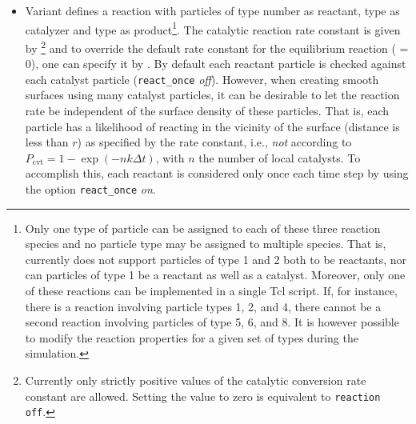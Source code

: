 \begin{itemize}
\item Variant  defines a reaction with particles of type
  number  as reactant, type  as catalyzer and type
   as product\footnote{Only one type of particle can be
    assigned to each of these three reaction species and no particle
    type may be assigned to multiple species. That is, \es currently
    does not support particles of type 1 and 2 both to be reactants,
    nor can particles of type 1 be a reactant as well as a
    catalyst. Moreover, only one of these reactions can be implemented
    in a single Tcl script. If, for instance, there is a reaction
    involving particle types 1, 2, and 4, there cannot be a second
    reaction involving particles of type 5, 6, and 8. It is however
    possible to modify the reaction properties for a given set of
    types during the simulation.}. The catalytic reaction rate
  constant is given by \footnote{Currently only strictly
    positive values of the catalytic conversion rate constant are
    allowed. Setting the value to zero is equivalent to
    \texttt{reaction off}.} and to override the default rate constant
  for the equilibrium reaction ( = 0), one can specify it
  by . By default each reactant particle is checked against
  each catalyst particle (\texttt{react\_once} \emph{off}). However,
  when creating smooth surfaces using many catalyst particles, it can
  be desirable to let the reaction rate be independent of the surface
  density of these particles. That is, each particle has a likelihood
  of reacting in the vicinity of the surface (distance is less than
  $r$) as specified by the rate constant, i.e., \emph{not} according
  to $P_{\text{cvt}} = 1 - \exp \left( - n k\Delta t \right)$, with
  $n$ the number of local catalysts. To accomplish this, each reactant
  is considered only once each time step by using the option
  \texttt{react\_once} \emph{on}.


\end{itemize}
